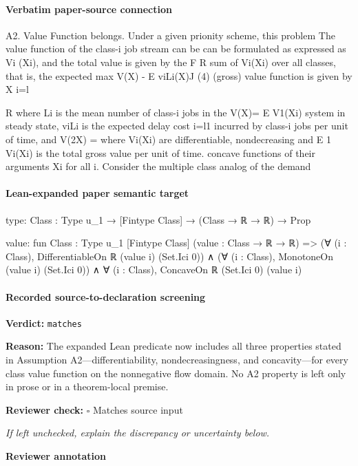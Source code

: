 \documentclass[10pt]{article}
\newcommand{\reviewerbox}{%
  \par\noindent\fbox{\parbox{0.96\linewidth}{\rule{0pt}{0.38in}}}\par
}
\newcommand{\reviewmatch}[1]{%
  \par\noindent\textbf{Reviewer check:} $\square$\; #1\par
  \noindent\emph{If left unchecked, explain the discrepancy or uncertainty below.}\par
}
\begin{document}
\paragraph{Verbatim paper-source connection}
\begin{ReviewVerbatim}
A2. Value Function
                                                                       belongs. Under a given prionity scheme, this problem
The value function of the class-i job stream can be                    can be formulated as
expressed as Vi (Xi), and the total value is given by the                        F       R
sum of Vi(Xi) over all classes, that is, the expected                   max V(X) - E viLi(X)J (4)
(gross) value function is given by                                          X        i=l


           R                                                           where Li is the mean number of class-i jobs in the
V(X)= E V1(Xi)                                                         system in steady state, viLi is the expected delay cost
           i=l1
                                                                       incurred by class-i jobs per unit of time, and V(2X) =
where Vi(Xi) are differentiable, nondecreasing and                     E 1 Vi(Xi) is the total gross value per unit of time.
concave functions of their arguments Xi for all i.                       Consider the multiple class analog of the demand
\end{ReviewVerbatim}



\paragraph{Lean-expanded paper semantic target}
\begin{ReviewVerbatim}
type:
{Class : Type u_1} → [Fintype Class] → (Class → ℝ → ℝ) → Prop

value:
fun {Class : Type u_1} [Fintype Class] (value : Class → ℝ → ℝ) =>
  (∀ (i : Class), DifferentiableOn ℝ (value i) (Set.Ici 0)) ∧
    (∀ (i : Class), MonotoneOn (value i) (Set.Ici 0)) ∧ ∀ (i : Class), ConcaveOn ℝ (Set.Ici 0) (value i)
\end{ReviewVerbatim}


\paragraph{Recorded source-to-declaration screening}
\textbf{Verdict:} \texttt{matches}
\\
{\raggedright
\textbf{Reason:} The expanded Lean predicate now includes all three properties stated in Assumption A2—differentiability, nondecreasingness, and concavity—for every class value function on the nonnegative flow domain.\allowbreak{} No A2 property is left only in prose or in a theorem-\allowbreak{}local premise.\allowbreak{}
\par}
\reviewmatch{Matches source input}
\noindent\textbf{Reviewer annotation}\par
\reviewerbox
\clearpage
\hypertarget{paper-prerequisite-816477dc3af70c36}{}
\end{document}
